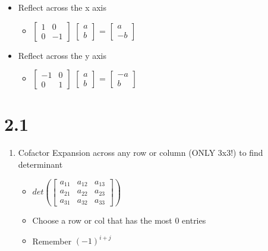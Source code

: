 \documentclass[letterpaper, 12pt]{article}
\begin{document}
\begin{enumerate}
\begin{itemize}
\begin{itemize}
\end{itemize}
\item Reflect across the x axis\\
\begin{itemize}
\item \(\begin{bmatrix}1&0\\0&-1\end{bmatrix}\) \(\begin{bmatrix}a\\b\end{bmatrix}\) = \(\begin{bmatrix}a\\-b\end{bmatrix}\)\\
\end{itemize}
\item Reflect across the y axis\\
\begin{itemize}
\item \(\begin{bmatrix}-1&0\\0&1\end{bmatrix}\) \(\begin{bmatrix}a\\b\end{bmatrix}\) = \(\begin{bmatrix}-a\\b\end{bmatrix}\)\\
\end{itemize}
\end{itemize}
\end{enumerate}
\section{2.1}
\label{sec:org2174aeb}
\begin{enumerate}
\item Cofactor Expansion across any row or column (ONLY 3x3!) to find determinant\\
\begin{itemize}
\item \(det(\begin{bmatrix}a_{11}&a_{12}&a_{13}\\a_{21}&a_{22}&a_{23}\\a_{31}&a_{32}&a_{33}\end{bmatrix})\)\\
\item Choose a row or col that has the most 0 entries\\
\item Remember \((-1)^{i+j}\)\\
\end{itemize}
\end{enumerate}
\end{document}
